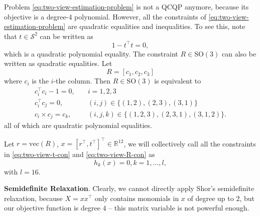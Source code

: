 \documentclass[
]{book}
\theoremstyle{definition}
\theoremstyle{definition}
\theoremstyle{definition}
\theoremstyle{definition}
\theoremstyle{remark}
\begin{document}
Problem \eqref{eq:two-view-estimation-problem} is not a QCQP anymore, because its objective is a degree-4 polynomial. However, all the constraints of \eqref{eq:two-view-estimation-problem} are quadratic equalities and inequalities. To see this, note that \(t \in \mathcal{S}^{2}\) can be written as
\begin{equation}
1 - t^\top t = 0,
\label{eq:two-view-t-con}
\end{equation}
which is a quadratic polynomial equality.
The constraint \(R \in \mathrm{SO}(3)\) can also be written as quadratic equalities. Let
\[
R = [c_1, c_2, c_3]
\]
where \(c_i\) is the \(i\)-the column. Then \(R\in \mathrm{SO}(3)\) is equivalent to
\begin{equation}
\begin{split}
c_i^\top c_i - 1= 0, & \quad i=1,2,3 \\
c_i^\top c_j = 0, & \quad (i,j) \in \{ (1,2),(2,3),(3,1) \} \\
c_i \times c_j = c_k,& \quad (i,j,k) \in \{ (1,2,3),(2,3,1),(3,1,2) \}. 
\end{split}
\label{eq:two-view-R-con}
\end{equation}
all of which are quadratic polynomial equalities.

Let \(r = \mathrm{vec}(R)\), \(x = [r^\top, t^\top]^\top\in \mathbb{R}^{12}\), we will collectively call all the constraints in \eqref{eq:two-view-t-con} and \eqref{eq:two-view-R-con} as
\[
h_k(x) = 0, k=1,\dots,l, 
\]
with \(l=16\).

\textbf{Semidefinite Relaxation}. Clearly, we cannot directly apply Shor's semidefinite relaxation, because \(X = xx^\top\) only contains monomials in \(x\) of degree up to \(2\), but our objective function is degree \(4\) -- this matrix variable is not powerful enough.
\end{document}

